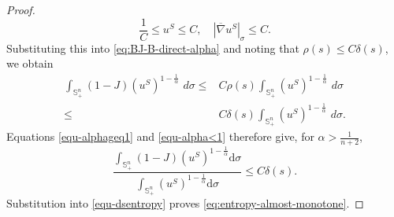 \documentclass[11pt, reqno]{amsart}
\theoremstyle{remark}
\theoremstyle{definition}
\numberwithin{equation}{section}
\newcommand{\dd}{\,d}
\begin{document}
\begin{proof}
\begin{equation*}
	  \dfrac{1}{C}\leq u^S \leq C,\quad |\overline{\nabla}u^S|_{\sigma} \leq C.
\end{equation*}
 Substituting this into \eqref{eq:BJ-B-direct-alpha} and noting that $\rho(s)\leq C\delta(s)$, we obtain
\begin{align}
	\int_{\mathbb{S}^n_+}(1-J)(u^S)^{1-\frac{1}{\alpha}}\,\dd\sigma \leq &C\rho(s)\int_{\mathbb{S}^n_+}(u^S)^{1-\frac{1}{\alpha}}\,\dd\sigma \nonumber\\
    \leq &C\delta(s)\int_{\mathbb{S}^n_+}(u^S)^{1-\frac{1}{\alpha}}\,\dd\sigma.
    \label{equ-alpha<1}
\end{align}
Equations \eqref{equ-alphageq1} and \eqref{equ-alpha<1} therefore give, for $\alpha>\frac{1}{n+2}$,
\begin{equation*}
        \dfrac{\displaystyle\int_{\mathbb{S}_+^n} (1-J)(u^S)^{1-\frac{1}{\alpha}}\mathrm{d}\sigma}{\displaystyle\int_{\mathbb{S}_+^n} (u^S)^{1-\frac{1}{\alpha}}\mathrm{d}\sigma}  \leq C\delta(s).
\end{equation*}
Substitution into \eqref{equ-dsentropy} proves \eqref{eq:entropy-almost-monotone}.
\end{proof}
\end{document}
